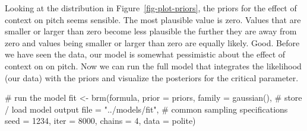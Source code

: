 \documentclass[
  doc,
  floatsintext,
  longtable,
  nolmodern,
  notxfonts,
  notimes,
  colorlinks=true,linkcolor=blue,citecolor=blue,urlcolor=blue]{apa7}
\newenvironment{Shaded}{\begin{snugshade}}{\end{snugshade}}
\newcommand{\AttributeTok}[1]{\textcolor[rgb]{0.40,0.45,0.13}{#1}}
\newcommand{\CommentTok}[1]{\textcolor[rgb]{0.37,0.37,0.37}{#1}}
\newcommand{\DecValTok}[1]{\textcolor[rgb]{0.68,0.00,0.00}{#1}}
\newcommand{\FunctionTok}[1]{\textcolor[rgb]{0.28,0.35,0.67}{#1}}
\newcommand{\NormalTok}[1]{\textcolor[rgb]{0.00,0.23,0.31}{#1}}
\newcommand{\OtherTok}[1]{\textcolor[rgb]{0.00,0.23,0.31}{#1}}
\newcommand{\StringTok}[1]{\textcolor[rgb]{0.13,0.47,0.30}{#1}}
\begin{document}
Looking at the distribution in Figure~\ref{fig-plot-priors}, the priors
for the effect of context on pitch seems sensible. The most plausible
value is zero. Values that are smaller or larger than zero become less
plausible the further they are away from zero and values being smaller
or larger than zero are equally likely. Good. Before we have seen the
data, our model is somewhat pessimistic about the effect of context on
on pitch. Now we can run the full model that integrates the likelihood
(our data) with the priors and visualize the posteriors for the critical
parameter.

\begin{Shaded}
\begin{Highlighting}[]
\CommentTok{\# run the model}
\NormalTok{fit }\OtherTok{\textless{}{-}} \FunctionTok{brm}\NormalTok{(formula,}
           \AttributeTok{prior =}\NormalTok{ priors,}
           \AttributeTok{family =} \FunctionTok{gaussian}\NormalTok{(),}
           \CommentTok{\# store / load model output}
           \AttributeTok{file  =} \StringTok{"../models/fit"}\NormalTok{,}
           \CommentTok{\# common sampling specifications}
           \AttributeTok{seed =} \DecValTok{1234}\NormalTok{,}
           \AttributeTok{iter =} \DecValTok{8000}\NormalTok{,}
           \AttributeTok{chains =} \DecValTok{4}\NormalTok{,}
           \AttributeTok{data =}\NormalTok{ polite)}
\end{Highlighting}
\end{Shaded}
\end{document}
